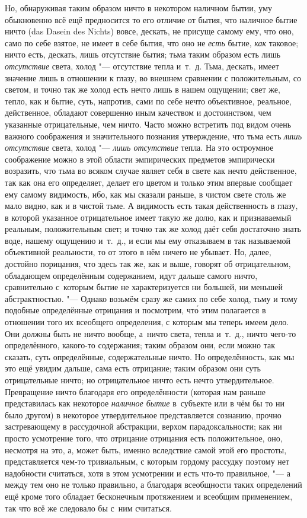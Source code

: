 Но, обнаруживая таким образом ничто в некотором наличном бытии, уму обыкновенно
всё ещё предносится то его отличие от бытия, что наличное бытие ничто (das
Dasein des Nichts) вовсе, дескать, не присуще самому ему, что оно, само по себе
взятое, не имеет в себе бытия, что оно не {\em есть} бытие, {\em как} таковое; ничто
есть, дескать, лишь отсутствие бытия; тьма таким образом есть лишь
{\em отсутствие} света, холод "--- отсутствие тепла и~т.~д. Тьма, дескать,
имеет значение лишь в отношении к глазу, во внешнем сравнении с положительным,
со светом, и точно так же холод есть нечто лишь в нашем ощущении; свет же,
тепло, как и бытие, суть, напротив, сами по себе нечто объективное, реальное,
действенное, обладают совершенно иным качеством и достоинством, чем указанные
отрицательные, чем ничто. Часто можно встретить под видом очень важного
соображения и значительного познания утверждение, что тьма есть
{\em лишь отсутствие} света, холод "--- {\em лишь отсутствие} тепла. На это
остроумное соображение можно в этой области эмпирических предметов эмпирически
возразить, что тьма во всяком случае являет себя в свете как нечто действенное,
так как она его определяет, делает его цветом и только этим впервые сообщает
ему самому видимость, ибо, как мы сказали раньше, в чистом свете столь же мало
видно, как и в чистой тьме. А видимость есть такая действенность в глазу, в
которой указанное отрицательное имеет такую же долю, как и признаваемый
реальным, положительным свет; и точно так же холод даёт себя достаточно знать
воде, нашему ощущению и~т.~д., и если мы ему отказываем в так называемой
объективной реальности, то от этого в нём ничего не убывает. Но, далее,
достойно порицания, что здесь так же, как и выше, говорят об отрицательном,
обладающем определённым содержанием, идут дальше самого ничто, сравнительно
с~которым бытие не характеризуется ни большей, ни меньшей абстрактностью. "---
Однако возьмём сразу же самих по себе холод, тьму и тому подобные определённые
отрицания и посмотрим, чт\'{о} этим полагается в отношении того их всеобщего
определения, с которым мы теперь имеем дело. Они должны быть не ничто вообще,
а~ничто света, тепла и~т.~д., ничто чего-то определённого, какого-то
содержания; таким образом они, если можно так сказать, суть определённые,
содержательные ничто. Но определённость, как мы это ещё увидим дальше, сама
есть отрицание; таким образом они суть отрицательные ничто; но отрицательное
ничто есть нечто утвердительное. Превращение ничто благодаря его определённости
(которая нам раньше представилась как некоторое {\em наличное бытие} в~субъекте
или в чём бы то ни было другом) в некоторое утвердительное представляется
сознанию, прочно застревающему в рассудочной абстракции, верхом
парадоксальности; как ни просто усмотрение того, что отрицание отрицания есть
положительное, оно, несмотря на это, а, может быть, именно вследствие самой
этой его простоты, представляется чем-то тривиальным, с которым гордому
рассудку поэтому нет надобности считаться, хотя в этом усмотрении и есть что-то
правильное, "--- а между тем оно не только правильно, а благодаря всеобщности
таких определений ещё кроме того обладает бесконечным протяжением и всеобщим
применением, так что всё же следовало бы с~ним считаться.

